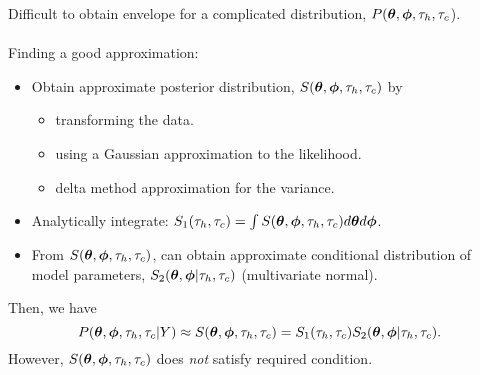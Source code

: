 \documentclass{report}
\newcommand{\bthet}{ \mbox{\boldmath $\theta$}}
\newcommand{\bphi}{ \mbox{\boldmath $\phi$}}
\begin{document}
{\LARGE Difficult to obtain envelope for a complicated distribution, $P(\bthet,\bphi,\tau_h,\tau_c$).\\\\%
Finding a good approximation:
\begin{itemize}
\item Obtain approximate posterior distribution, $S(\bthet,\bphi,\tau_h,\tau_c)$ by
  \begin{itemize}  
  \item transforming the data.
  \item using a Gaussian approximation to the likelihood.
  \item delta method approximation for the variance.
  \end{itemize}  
\item Analytically integrate: $S_1(\tau_h,\tau_c)=\int S(\bthet,\bphi,\tau_h,\tau_c)
d\bthet d\bphi$.
\item From $S(\bthet,\bphi,\tau_h,\tau_c)$, can obtain approximate conditional
  distribution of model parameters, $S_2(\bthet,\bphi|\tau_h,\tau_c)$ (multivariate normal).
\end{itemize}
Then, we have
$$P(\bthet,\bphi,\tau_h,\tau_c|Y) \approx S(\bthet,\bphi,\tau_h,\tau_c) = S_1(\tau_h,\tau_c) S_2(\bthet,\bphi|\tau_h,\tau_c).$$
However, $S(\bthet,\bphi,\tau_h,\tau_c)$ does {\it not} satisfy required condition.

}
\end{document}

